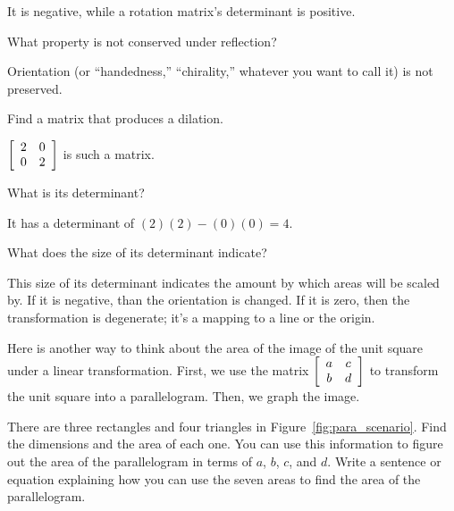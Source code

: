\documentclass[../key.tex]{subfiles}
\begin{document}
It is negative, while a rotation matrix's determinant is positive.

\begin{iinner_problem}
\item What property is not conserved under reflection?
\end{iinner_problem}

Orientation (or ``handedness,'' ``chirality,'' whatever you want to call it) is not preserved.

\begin{inner_problem}
\item Find a matrix that produces a dilation.
\end{inner_problem}

$\left[\begin{array}{cc} 2 & 0 \\ 0 & 2 \end{array}\right]$ is such a matrix.

\begin{iinner_problem}
\item What is its determinant?
\end{iinner_problem}

It has a determinant of $(2)(2)-(0)(0)=4$.

\begin{iinner_problem}
\item What does the size of its determinant indicate?
\end{iinner_problem}

This size of its determinant indicates the amount by which areas will be scaled by. If it is negative, than the orientation is changed. If it is zero, then the transformation is degenerate; it's a mapping to a line or the origin.

\begin{outer_problem}
\item Here is another way to think about the area of the image of the unit square under a linear transformation. First, we use the matrix $\left[\begin{array}{cc} a & c \\ b & d \end{array}\right]$ to transform the unit square into a parallelogram. Then, we graph the image. \label{prob:unit_square_into_parallelogram}
\end{outer_problem}

\begin{inner_problem}[start=1]
\item There are three rectangles and four triangles in Figure~\ref{fig:para_scenario}. Find the dimensions and the area of each one. You can use this information to figure out the area of the parallelogram in terms of $a$, $b$, $c$, and $d$. Write a sentence or equation explaining how you can use the seven areas to find the area of the parallelogram.
\end{inner_problem}
\end{document}
